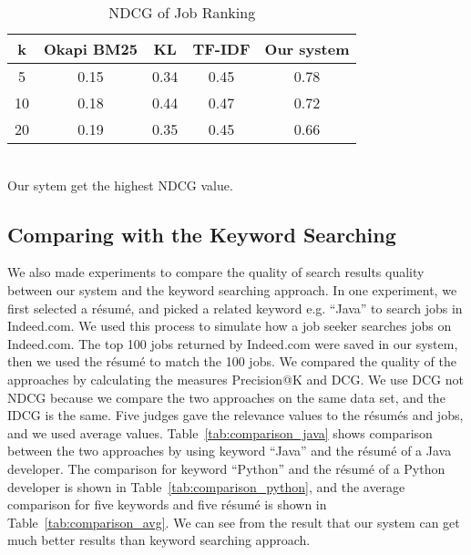 \begin{table}[ht]
\caption{NDCG of Job Ranking } %
\centering %
\begin{tabular}{    | c | c | c | c | c |  }
 \hline
       k    & Okapi BM25 & KL    & TF-IDF & Our system  \\
 \hline
       5    & 0.15       & 0.34  & 0.45     & 0.78   \\
 \hline
       10   & 0.18       & 0.44  & 0.47     & 0.72   \\
 \hline
       20   & 0.19       & 0.35  & 0.45     & 0.66   \\
 \hline

\end{tabular}
\label{tab:job_ndcg} %
\\Our sytem get the highest NDCG value.
\end{table}

\subsection{Comparing with the Keyword Searching}
We also made experiments to compare the quality of search results quality between our system and the keyword searching approach. In one experiment, we first selected a r\'esum\'e, and picked a related keyword e.g. ``Java''  to search jobs in Indeed.com. We used this process to simulate how a job seeker searches jobs on Indeed.com. The top 100 jobs returned by Indeed.com were saved in our system, then we used the r\'esum\'e to match the 100 jobs. We compared the quality of the approaches by calculating the measures Precision@K  and  DCG. We use DCG not NDCG because we compare the two approaches on the same data set, and the IDCG is the same. Five judges gave the relevance values to the r\'esum\'es and jobs, and we used average values. Table~\ref{tab:comparison_java} shows comparison between the two approaches by using keyword ``Java'' and the r\'esum\'e of a Java developer. The comparison for  keyword ``Python'' and the r\'esum\'e of a Python developer is shown in Table~\ref{tab:comparison_python}, and the average comparison for five keywords and five r\'esum\'e is shown in Table~\ref{tab:comparison_avg}. We can see from the result that our system can get much better results than keyword searching approach.

